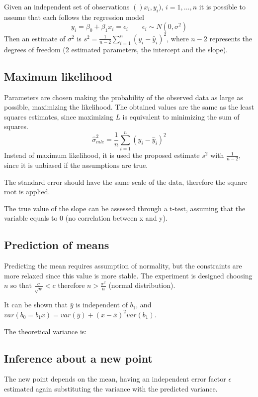 Given an independent set of observations $()x_i, y_i)$, $i = 1, \dots, n$ it is possible to assume that each follows the regression model
$$y_i = \beta_0 + \beta_1 x_i = \epsilon_i \qquad \epsilon_i \sim N(0, \sigma^2)$$
Then an estimate of $\sigma^2$ is $s^2 = \frac{1}{n-2} \sum_{i=1}^{n}(y_i - \hat{y}_i)^2$, where $n - 2$ represents the degrees of freedom (2 estimated parameters, the intercept and the slope). 

\subsection{Maximum likelihood}
Parameters are chosen making the probability of the observed data as large as possible, maximizing the likelihood. The obtained values are the same as the least squares estimates, since maximizing $L$ is equivalent to minimizing the sum of squares. 
$$\hat{\sigma}^2_{mle} = \frac{1}{n} \sum_{i=1}^{n}(y_i - \hat{y}_i)^2$$
Instead of maximum likelihood, it is used the proposed estimate $s^2$ with $\frac{1}{n-2}$, since it is unbiased if the assumptions are true.

The standard error should have the same scale of the data, therefore the square root is applied. 

The true value of the slope can be assessed through a t-test, assuming that the variable equals to 0 (no correlation between x and y). 

\subsection{Prediction of means}
Predicting the mean requires assumption of normality, but the constraints are more relaxed since this value is more stable. The experiment is designed choosing $n$ so that $\frac{\sigma}{\sqrt{n}} < c$ therefore $n > \frac{\sigma^2}{n}$ (normal distribution).

It can be shown that $\bar{y}$ is independent of $b_1$, and $var(b_0 = b_1x) = var(\bar{y}) + (x - \bar{x})^2 var(b_1)$.

The theoretical variance is:

\subsection{Inference about a new point}
The new point depends on the mean, having an independent error factor $\epsilon$ estimated again substituting the variance with the predicted variance.

